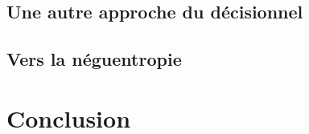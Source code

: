 \documentclass[a4paper,12pt]{report}
\begin{document}
\section{Une autre approche du décisionnel}

\section{Vers la néguentropie}

\chapter*{Conclusion}




\newpage
\printglossary
\newpage
\printglossary[type=\acronymtype]
\end{document}
